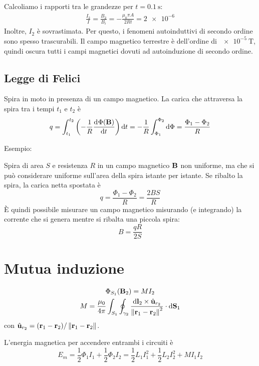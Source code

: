 Calcoliamo i rapporti tra le grandezze per $t = \qty{0.1}{\second}$:
\begin{gather}
    \frac{I_2}{I} = \frac{B_2}{B_i} = -\frac{\mu_0 \pi A}{2 R t}
    = \num{2e-6}
\end{gather}
Inoltre, $I_2$ è sovrastimata.
Per questo, i fenomeni autoinduttivi di secondo ordine sono spesso trascurabili.
Il campo magnetico terrestre è dell'ordine di $\qty{e-5}{\tesla}$, quindi oscura tutti i campi magnetici dovuti ad autoinduzione di secondo ordine.

\subsection{Legge di Felici}

Spira in moto in presenza di un campo magnetico.
La carica che attraversa la spira tra i tempi $t_1$ e $t_2$ è
\begin{equation}
    q = \int_{t_1}^{t_2} \pts{-\frac{1}{R} \der[\Phi(\B)]{t}}\de t
    = -\frac{1}{R} \int_{\Phi_1}^{\Phi_2} \de \Phi
    = \frac{\Phi_1 - \Phi_2}{R}
\end{equation}

Esempio:

Spira di area $S$ e resistenza $R$ in un campo magnetico $\mathbf{B}$ non uniforme, ma che si può considerare uniforme sull'area della spira istante per istante.
Se ribalto la spira, la carica netta spostata è
\begin{equation}
    q = \frac{\Phi_1 - \Phi_2}{R} = \frac{2 B S}{R}
\end{equation}
È quindi possibile misurare un campo magnetico misurando (e integrando) la corrente che si genera mentre si ribalta una piccola spira:
\begin{equation}
    B = \frac{qR}{2S}
\end{equation}

\section{Mutua induzione}

\begin{gather}
    \Phi_{S_1}(\mathbf{B}_2) = M I_2 \\
    M = \frac{\mu_0}{4\pi} \int_{S_1} \oint_{\gamma_2} \frac{\mathrm{d} \mathbf{l}_2 \times \hat{\mathbf{u}}_{r_2}}{\left\lVert \mathbf{r}_1 - \mathbf{r}_2 \right\rVert^2} \cdot \mathrm{d} \mathbf{S}_1
\end{gather}
con $\hat{\mathbf{u}}_{r_2} = (\mathbf{r}_1 - \mathbf{r}_2) / \left\lVert \mathbf{r}_1 - \mathbf{r}_2 \right\rVert$.

L'energia magnetica per accendere entrambi i circuiti è
\begin{equation}
    E_m = \frac{1}{2} \Phi_1 I_1 + \frac{1}{2} \Phi_2 I_2
    = \frac{1}{2} L_1 I_1^2 + \frac{1}{2} L_2 I_2^2 + M I_1 I_2
\end{equation}


